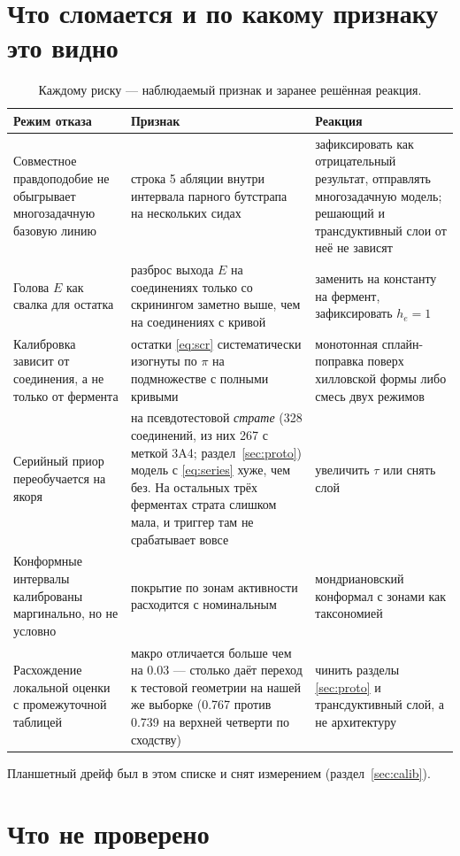 \section{Что сломается и по какому признаку это видно}

\begin{table}[htbp]\centering\small
\begin{tabularx}{\textwidth}{@{}p{40mm}Xp{42mm}@{}}
\toprule
Режим отказа & Признак & Реакция \\
\midrule
Совместное правдоподобие не обыгрывает многозадачную базовую линию
& строка 5 абляции внутри интервала парного бутстрапа на нескольких сидах
& зафиксировать как отрицательный результат, отправлять многозадачную модель; решающий и трансдуктивный слои от неё не зависят \\
Голова $E$ как свалка для остатка
& разброс выхода $E$ на соединениях только со скринингом заметно выше, чем на соединениях с кривой
& заменить на константу на фермент, зафиксировать $h_e = 1$ \\
Калибровка зависит от соединения, а не только от фермента
& остатки \eqref{eq:scr} систематически изогнуты по $\pi$ на подмножестве с полными кривыми
& монотонная сплайн-поправка поверх хилловской формы либо смесь двух режимов \\
Серийный приор переобучается на якоря
& на псевдотестовой \emph{страте} (328 соединений, из них 267 с меткой 3A4;
раздел~\ref{sec:proto}) модель с \eqref{eq:series} хуже, чем без. На остальных трёх
ферментах страта слишком мала, и триггер там не срабатывает вовсе
& увеличить $\tau$ или снять слой \\
Конформные интервалы калиброваны маргинально, но не условно
& покрытие по зонам активности расходится с номинальным
& мондриановский конформал с зонами как таксономией \\
Расхождение локальной оценки с промежуточной таблицей
& макро отличается больше чем на 0.03 --- столько даёт переход к тестовой геометрии
на нашей же выборке (0.767 против 0.739 на верхней четверти по сходству)
& чинить разделы \ref{sec:proto} и трансдуктивный слой, а не архитектуру \\
\bottomrule
\end{tabularx}
\caption{Каждому риску --- наблюдаемый признак и заранее решённая реакция.}
\end{table}

Планшетный дрейф был в этом списке и снят измерением (раздел~\ref{sec:calib}).

\section{Что не проверено}

